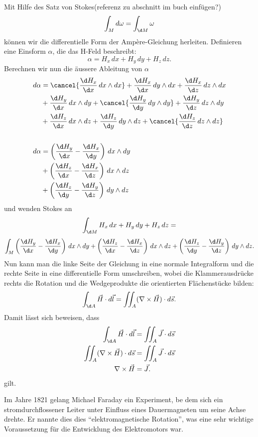 Mit Hilfe des Satz von Stokes(referenz zu abschnitt im buch einfügen?)
$$
\int_{M} d\omega
=
\int_{\d M} \omega
$$
können wir die differentielle Form der Ampère-Gleichung herleiten. Definieren eine Einsform $\alpha$, die das H-Feld beschreibt:
$$
\alpha
=
H_x \, dx + H_y \, dy + H_z \, dz . 
$$
Berechnen wir nun die äussere Ableitung von $\alpha$
\begin{align*}
	d\alpha 
	&=
	\cancel{\frac{\d H_x}{\d x} \, dx \wedge dx} + \frac{\d H_x}{\d x} \, dy \wedge dx + \frac{\d H_x}{\d z} \, dz \wedge dx
	\\
	&+
	\frac{\d H_y}{\d x} \, dx \wedge dy + \cancel{\frac{\d H_y}{\d y} \, dy \wedge dy} + \frac{\d H_y}{\d z} \, dz \wedge dy
	\\
	&+
	\frac{\d H_z}{\d x} \, dx \wedge dz + \frac{\d H_z}{\d y} \, dy \wedge dz + \cancel{\frac{\d H_z}{\d z} \, dz \wedge dz}
	\\
	\\
	d\alpha
	&=
	\left(\frac{\d H_y}{\d x} - \frac{\d H_x}{\d y}\right) \, dx \wedge dy
	\\
	&+
	\left(\frac{\d H_z}{\d x} - \frac{\d H_x}{\d z}\right) \, dx \wedge dz
	\\
	&+
	\left(\frac{\d H_z}{\d y} - \frac{\d H_y}{\d z}\right) \, dy \wedge dz
\end{align*}
und wenden Stokes an
$$
\int_{\d M} H_x \, dx + H_y \, dy + H_z \, dz
=
$$
$$
\int_{M} \left(\frac{\d H_y}{\d x} - \frac{\d H_x}{\d y}\right) \, dx \wedge dy
+
\left(\frac{\d H_z}{\d x} - \frac{\d H_x}{\d z}\right) \, dx \wedge dz
+
\left(\frac{\d H_z}{\d y} - \frac{\d H_y}{\d z}\right) \, dy \wedge dz .
$$
Nun kann man die linke Seite der Gleichung in eine normale Integralform und die rechte Seite in eine differentielle Form umschreiben, wobei die Klammerausdrücke rechts die Rotation und die Wedgeprodukte die orientierten Flächenstücke bilden: 
$$
\int_{\d A} \vec{H} \cdot d\vec{l}
=
\iint_{A} (\nabla \times \vec{H}) \cdot d\vec{s} .
$$
Damit lässt sich beweisen, dass
\begin{align*}
	\int_{\d A}
	\vec{H} \cdot d\vec{l}
	&=
	\iint_{A}
	\vec{J} \cdot d\vec{s}
	\\
	\iint_{A}
	(
	\nabla \times \vec{H}
	)
	\cdot
	d\vec{s}
	&=
	\iint_{A}
	\vec{J} \cdot d\vec{s}
	\\
	\nabla \times \vec{H}
	&=
	\vec{J} .
\end{align*}
gilt.


Im Jahre 1821 gelang Michael Faraday ein Experiment, be dem sich ein stromdurchflossener Leiter unter Einfluss eines Dauermagneten um seine Achse drehte.
Er nannte dies dies ``elektromagnetische Rotation'', was eine sehr wichtige Voraussetzung für die Entwicklung des Elektromotors war.


